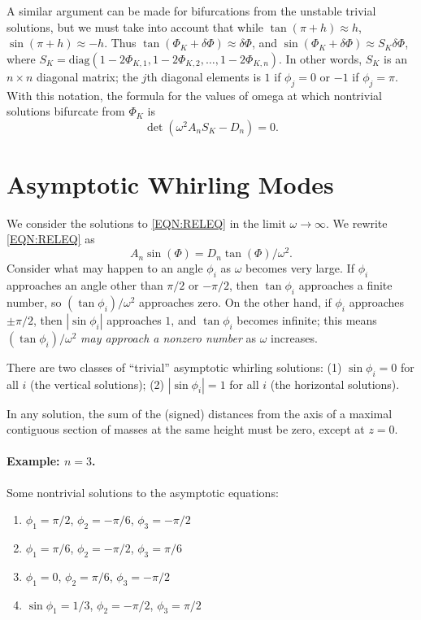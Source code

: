 \documentclass[11pt]{amsart}
\newcommand{\diag}{\textrm{diag}}
\begin{document}
A similar argument can be made for bifurcations from the unstable trivial solutions,
but we must take into account that while $\tan(\pi+h)\approx h$,
$\sin(\pi+h) \approx -h$.
Thus $\tan(\Phi_K + \delta\Phi) \approx \delta\Phi$,
and $\sin(\Phi_K+\delta\Phi) \approx S_K \delta\Phi$, where
$S_K = \diag( 1-2\Phi_{K,1}, 1-2\Phi_{K,2}, \ldots, 1-2\Phi_{K,n})$.
In other words, $S_K$ is an $n\times n$ diagonal matrix; the $j$th diagonal
elements is $1$ if $\phi_j = 0$ or $-1$ if $\phi_j = \pi$.
With this notation, the formula for the values of omega at which nontrivial
solutions bifurcate from $\Phi_K$ is
\begin{equation}
   \det\left(\omega^2A_n S_K - D_n\right) = 0.
\end{equation}

\section{Asymptotic Whirling Modes}
We consider the solutions to \eqref{EQN:RELEQ} in the limit $\omega\rightarrow\infty$.
We rewrite \eqref{EQN:RELEQ} as
\begin{equation}
    A_n \sin(\Phi) = D_n\tan(\Phi)/\omega^2.
    \label{EQN:RELEQ2}
\end{equation}
Consider what may happen to an angle $\phi_i$ as $\omega$ becomes very large.
If $\phi_i$ approaches an angle other than $\pi/2$ or $-\pi/2$, then
$\tan\phi_i$ approaches a finite number, so $(\tan\phi_i)/\omega^2$ approaches
zero.  On the other hand, if $\phi_i$ approaches $\pm\pi/2$,
then $|\sin\phi_i|$ approaches $1$, and
$\tan\phi_i$ becomes infinite; this means $(\tan\phi_i)/\omega^2$
\emph{may approach a nonzero number} as $\omega$ increases.

There are two classes of ``trivial'' asymptotic whirling solutions:
(1) $\sin\phi_i =0$ for all $i$ (the vertical solutions);
(2) $|\sin\phi_i| = 1$ for all $i$ (the horizontal solutions).

In any solution, the sum of the (signed) distances from the axis
of a maximal contiguous section of masses at the
same height must be zero, except at $z=0$.

\paragraph{Example: $n=3$.}  Some nontrivial solutions to the
asymptotic equations:
\begin{enumerate}
\item $\phi_1=\pi/2$, $\phi_2=-\pi/6$, $\phi_3 = -\pi/2$
\item $\phi_1=\pi/6$, $\phi_2 = -\pi/2$, $\phi_3 = \pi/6$
\item $\phi_1=0$, $\phi_2 = \pi/6$, $\phi_3 = -\pi/2$
\item $\sin\phi_1 = 1/3$, $\phi_2 = -\pi/2$, $\phi_3=\pi/2$
\end{enumerate}
\end{document}
